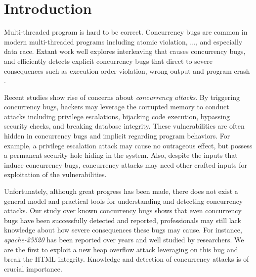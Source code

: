 \section{Introduction} \label{sec:intro}


Multi-threaded program is hard to be correct. 
Concurrency bugs are common in modern multi-threaded programs  
including atomic violation, ..., and especially data race\cite{lu:concurrency-bugs,conmem:asplos10,conseq:asplos11, lu:muvi:sosp}.
Extant work well explores interleaving that causes concurrency bugs, 
and efficiently detects explicit concurrency bugs that direct to  
severe consequences such as execution order violation, wrong output and program crash
\cite{wu2015:collaborative,tsan,valgrind:pldi,lu:muvi:sosp,conseq:asplos11,conmem:asplos10}.

Recent studies\cite{acidrain:sigmod17,con:hotpar12} show rise of concerns about \emph{concurrency attacks}.
By triggering concurrency bugs, 
hackers may leverage the corrupted memory to conduct  
attacks including privilege escalations\cite{uselib-bug-12791,mysql-bug-14747}, hijacking code execution\cite{berend-jan-wever-msiexploit}, bypassing security checks\cite{xwindows,theotheriphone,theotheriphone-2011}, 
and breaking database integrity\cite{acidrain:sigmod17}.
These vulnerabilities are often hidden in concurrency bugs and implicit regarding program behaviors. 
For example, a privilege escalation attack may cause no outrageous effect, 
but possess a permanent security hole hiding in the system.
Also, despite the inputs that induce concurrency bugs, 
concurrency attacks may need other crafted inputs for exploitation of the vulnerabilities. 



Unfortunately, although great progress has been made, there does not exist a general model and practical tools  
for understanding and detecting concurrency attacks.
Our study over known concurrency 
bugs\cite{apache-bug-25520, apache-bug-46215} shows that 
even concurrency bugs have been successfully detected and reported, 
professionals may still lack knowledge about how severe consequences these bugs may cause. 
For instance, \emph{apache-25520}\cite{apache-bug-25520} has been 
reported over years and well studied by researchers\cite{lu:concurrency-bugs}.  
We are the first to exploit a new heap overflow attack leveraging on this bug and break the HTML integrity. 
Knowledge and detection of concurrency attacks is of crucial importance. 

